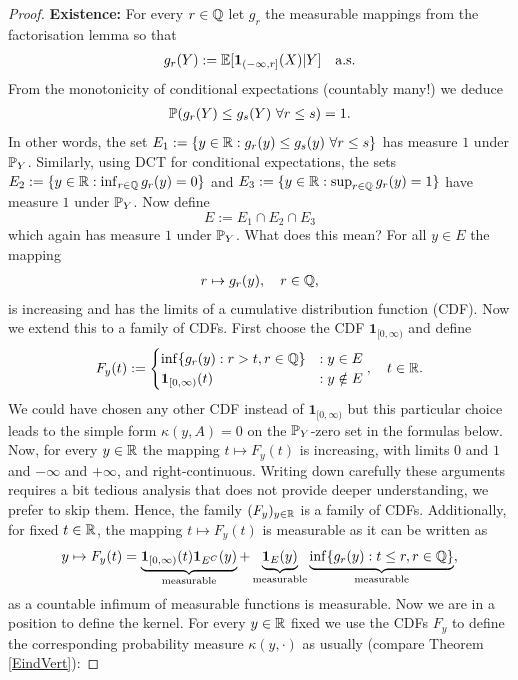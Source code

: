 \begin{proof}[Proof]
		\textbf{Existence:}
	For every $r\in \Q$ let $g_{r}$ the measurable mappings from the factorisation lemma so that
	\begin{align*}
		g_{r}(Y):=\E[\mathbf 1_{(-\infty,r]}(X)|Y]\quad \text{a.s.}
	\end{align*}
	From the monotonicity of conditional expectations (countably many!) we deduce
	\begin{align*}
		\P(g_r(Y)\leq g_s(Y)\,\,\forall r\leq s)=1.
	\end{align*}
	In other words, the set $E_1:=\{y\in \R: g_r(y)\leq g_s(y) \,\,\forall r\leq s\}$ has measure $1$ under $\P_Y$. Similarly, using DCT for conditional expectations, the sets $E_2:=\{y\in \R: \inf_{r\in\Q} g_r(y)=0\}$ and $E_3:=\{y\in \R: \sup_{r\in\Q} g_r(y)=1\}$ have measure $1$ under $\P_Y$. Now define $$E:=E_1\cap E_2\cap E_3$$ which again has measure $1$ under $\P_Y$. What does this mean? For all $y\in E$ the mapping
	\begin{align*}
		r\mapsto g_r(y), \quad r\in \Q,
	\end{align*}
	is increasing and has the limits of a cumulative distribution function (CDF). Now we extend this to a family of CDFs. First choose the CDF $\mathbf 1_{[0,\infty)}$ and define
	\begin{align*}
		F_y(t):=\begin{cases}
			\inf\{g_r(y): r>t, r\in\Q \}&: y\in E\\
			\mathbf 1_{[0,\infty)}(t)&:y\notin E
		\end{cases},\quad t\in\R.
	\end{align*}
	We could have chosen any other CDF instead of $\mathbf 1_{[0,\infty)}$ but this particular choice leads to the simple form $\kappa(y,A)=0$ on the $\P_Y$-zero set in the formulas below. Now, for every $y\in \R$ the mapping $t\mapsto F_y(t)$ is increasing, with limits $0$ and $1$ and $-\infty$ and $+\infty$, and right-continuous. Writing down carefully these arguments requires a bit tedious analysis that does not provide deeper understanding, we prefer to skip them. Hence, the family $(F_y)_{y\in\R}$ is a family of CDFs. Additionally, for fixed $t\in \R$, the mapping $t\mapsto F_y(t)$ is measurable as it can be written as
	\begin{align*}
		y\mapsto F_y(t)= \underbrace{\mathbf 1_{[0,\infty)}(t) \mathbf 1_{E^C}(y)}_{\text{measurable}}+ \underbrace{\mathbf 1_{E}(y)}_{\text{measurable}}\underbrace{\inf\{g_r(y):t\leq r, r\in\Q \}}_{\text{measurable}},
	\end{align*}
	as a countable infimum of measurable functions is measurable. Now we are in a position to define the kernel. For every $y\in\R$ fixed we use the CDFs $F_y$ to define the corresponding probability measure $\kappa(y,\cdot)$ as usually (compare Theorem \ref{EindVert}):

\end{proof}
